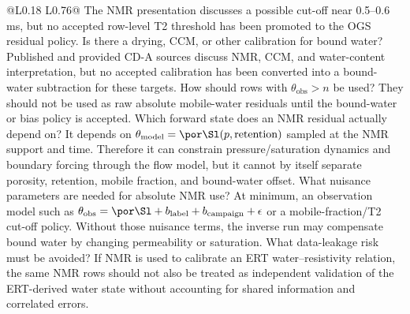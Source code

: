 \begin{longtable}{@{}L{0.18\textwidth} L{0.76\textwidth}@{}}
{The NMR presentation discusses a possible cut-off near 0.5--0.6 ms, but no accepted
row-level T2 threshold has been promoted to the OGS residual policy.}
{ Is there a drying, CCM, or other calibration for bound water?}
{Published and provided CD-A sources discuss NMR, CCM, and water-content interpretation, but no
accepted calibration has been converted into a bound-water subtraction for these
targets.}
{ How should rows with \(\theta_{\mathrm{obs}}>n\) be used?}
{They should not be used as raw absolute mobile-water residuals until the
bound-water or bias policy is accepted.}
{ Which forward state does an NMR residual actually depend on?}
{It depends on \(\theta_{\mathrm{model}}=\por\Sl(p,\mathrm{retention})\) sampled at
the NMR support and time.  Therefore it can constrain pressure/saturation dynamics
and boundary forcing through the flow model, but it cannot by itself separate
porosity, retention, mobile fraction, and bound-water offset.}
{ What nuisance parameters are needed for absolute NMR use?}
{At minimum, an observation model such as
\(\theta_{\mathrm{obs}}=\por\Sl+b_{\mathrm{label}}+b_{\mathrm{campaign}}+\epsilon\)
or a mobile-fraction/T2 cut-off policy.  Without those nuisance terms, the inverse
run may compensate bound water by changing permeability or saturation.}
{ What data-leakage risk must be avoided?}
{If NMR is used to calibrate an ERT water--resistivity relation, the same NMR rows
should not also be treated as independent validation of the ERT-derived water state
without accounting for shared information and correlated errors.}
\bottomrule
\end{longtable}

